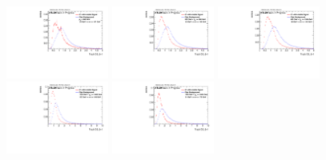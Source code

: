 \begin{figure}
\bigskip
\includegraphics[width=0.3\textwidth]{sascha_input/Appendix/Distributions/higgs/distributions/beta1/h_normal_tj_D2_bin1.pdf} \hspace{1mm}
\includegraphics[width=0.3\textwidth]{sascha_input/Appendix/Distributions/higgs/distributions/beta1/h_normal_tj_D2_bin2.pdf} \hspace{4mm}
\includegraphics[width=0.3\textwidth]{sascha_input/Appendix/Distributions/higgs/distributions/beta1/h_normal_tj_D2_bin3.pdf} 
\bigskip
\includegraphics[width=0.3\textwidth]{sascha_input/Appendix/Distributions/higgs/distributions/beta1/h_normal_tj_D2_bin4.pdf} \hspace{4mm}
\includegraphics[width=0.3\textwidth]{sascha_input/Appendix/Distributions/higgs/distributions/beta1/h_normal_tj_D2_bin5.pdf} 


\end{figure}
